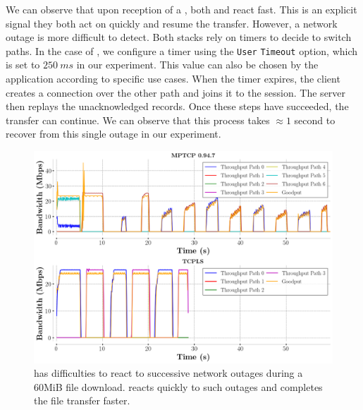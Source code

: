 We can observe that upon reception of a \tcp \rst, both \tcpls and \mptcp react fast. This is an explicit signal they both act on quickly and resume the transfer. However, a network outage is more difficult to detect. Both stacks rely on timers to decide to switch paths. In the case of \tcpls, we configure a timer using the \tcp \texttt{User} \texttt{Timeout} option, which is set to $250~ms$ in our experiment. This value can also be chosen by the application according to specific use cases.
When the timer expires, the client creates a connection over the other path and
joins it to the session. The server then replays the unacknowledged records.
Once these steps have succeeded, the transfer can continue. We can observe that
this process takes $\approx 1$ second to recover from this single outage in our
experiment.

\begin{figure}[!t]
  \begin{center}
    \includegraphics[width=\columnwidth]{figures/tcpls_mptcp.png}
  \end{center}
  \caption{\mptcp has difficulties to react to successive network outages during a 60MiB file download.
  \tcpls reacts quickly to such outages and completes the file transfer faster.}
  \label{fig:failover}
\end{figure}

